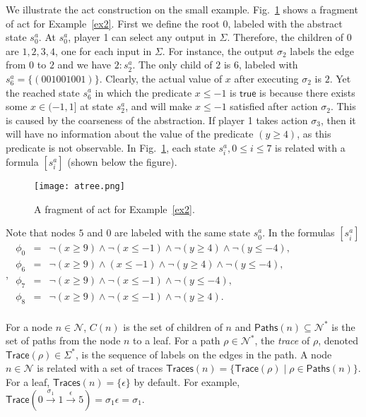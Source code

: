 \documentclass[letterpaper, 10 pt, conference]{ieeeconf}
\newcommand{\truev}{\mathsf{true}}
\begin{document}
We illustrate the \ac{act} construction on the small
example. Fig.~\ref{ex:act} shows a fragment of \ac{act} for
Example~\ref{ex2}.  First we define the root $0$, labeled with the
abstract state $s^a_0$. At $s^a_0$,
player 1 can select any output in $\Sigma$.  Therefore, the children
of $0$ are $1,2,3,4$, one for each input in $\Sigma$.  For instance,
the output $\sigma_2$ labels the edge from $0$ to $2$ and we have
$2:s^a_2$. The only child of $2$ is $6$, labeled with $s^a_6 =
\{(001001001)\}$.  Clearly, the actual value of $x$ after executing
$\sigma_2$ is $2$. Yet the reached state $s_6^a$ in which the
predicate $x \le-1$ is $\truev$ is because there exists some $x \in
(-1, 1] $ at state $s_2^a$, and will make $x \le -1$ satisfied after
action $\sigma_2$. This is caused by the coarseness of the
abstraction.  If player 1 takes action $\sigma_3$, then it will have
no information about the value of the predicate $(y\ge 4)$, as this
predicate is not observable. In Fig.~\ref{ex:act}, each state $s^a_i,
0\le i \le 7$ is related with a formula $[s^a_i]$ (shown below the figure).
\vspace{-2ex}
\begin{figure}[H]
\centering
\texttt{[image: atree.png]}
\caption{A fragment of \ac{act} for Example~\ref{ex2}. }
\label{ex:act}
\end{figure}
\vspace{-2ex}
Note that nodes
  $5$ and $0$ are labeled with the same state $s^a_0$. In the formulas
  $[s^a_i]$, 
$\begin{array}{lll}
  \phi_0 & = & \neg (x\ge 9) \land \neg (x \le-1) \land \neg (y\ge 4) \land \neg (y \le-4), \\
  \phi_6 & = & \neg (x\ge 9) \land (x \le-1) \land \neg (y\ge 4) \land \neg (y \le-4), \\
  \phi_7 & = & \neg (x\ge 9) \land \neg (x \le-1) \land \neg (y \le-4),  \\
  \phi_8 & = & \neg (x\ge 9) \land \neg (x \le-1) \land \neg (y\ge 4). \\
 \end{array}
 $



For a node $n\in \mathcal{N}$, $C(n)$ is the set of children of $n$
and $\mathsf{Paths}(n) \subseteq \mathcal N^*$ is the set of paths
from the node $n$ to a leaf.  For a path $\rho \in \mathcal{N}^\ast$,
the \emph{trace} of $\rho$, denoted $\mathsf{Trace}(\rho)\in
\Sigma^\ast$, is the sequence of labels on the edges in the path.  A
node $n \in \mathcal{N}$ is related with a set of traces
$\mathsf{Traces}(n)= \{ \mathsf{Trace}(\rho)\mid \rho \in
\mathsf{Paths}(n)\}$. For a leaf, $\mathsf{Traces}(n)=\{\epsilon\}$ by
default. For example, $\mathsf{Trace}(0\xrightarrow{\sigma_1}1
\xrightarrow{\epsilon} 5)=\sigma_1 \epsilon= \sigma_1$.
\end{document}
